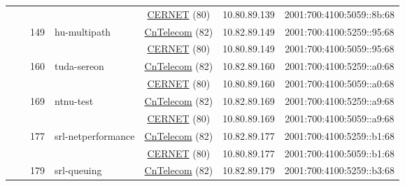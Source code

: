 \begin{small}
\begin{center}
\begin{longtable}{|c|c|c|c|c|c|c|c|}
  &  &  &  & \multicolumn{2}{|c|}{\tiny{\href{http://www.cernet.edu.cn}{CERNET} (80)}} & \tiny{10.80.89.139} & \tiny{2001:700:4100:5059::8b:68} \\* \cline{3-3}\cline{4-4}\cline{5-5}\cline{6-6}\cline{7-7}\cline{8-8}
  &  & \multirow{2}{*}{\tiny{149}} & \multicolumn{1}{|l|}{\multirow{2}{*}{\tiny{hu-multipath}}} & \multicolumn{2}{|c|}{\tiny{\href{http://www.chinatelecom.com.cn}{CnTelecom} (82)}} & \tiny{10.82.89.149} & \tiny{2001:700:4100:5259::95:68} \\* \cline{5-5}\cline{6-6}\cline{7-7}\cline{8-8}
  &  &  &  & \multicolumn{2}{|c|}{\tiny{\href{http://www.cernet.edu.cn}{CERNET} (80)}} & \tiny{10.80.89.149} & \tiny{2001:700:4100:5059::95:68} \\* \cline{3-3}\cline{4-4}\cline{5-5}\cline{6-6}\cline{7-7}\cline{8-8}
  &  & \multirow{2}{*}{\tiny{160}} & \multicolumn{1}{|l|}{\multirow{2}{*}{\tiny{tuda-sereon}}} & \multicolumn{2}{|c|}{\tiny{\href{http://www.chinatelecom.com.cn}{CnTelecom} (82)}} & \tiny{10.82.89.160} & \tiny{2001:700:4100:5259::a0:68} \\* \cline{5-5}\cline{6-6}\cline{7-7}\cline{8-8}
  &  &  &  & \multicolumn{2}{|c|}{\tiny{\href{http://www.cernet.edu.cn}{CERNET} (80)}} & \tiny{10.80.89.160} & \tiny{2001:700:4100:5059::a0:68} \\* \cline{3-3}\cline{4-4}\cline{5-5}\cline{6-6}\cline{7-7}\cline{8-8}
  &  & \multirow{2}{*}{\tiny{169}} & \multicolumn{1}{|l|}{\multirow{2}{*}{\tiny{ntnu-test}}} & \multicolumn{2}{|c|}{\tiny{\href{http://www.chinatelecom.com.cn}{CnTelecom} (82)}} & \tiny{10.82.89.169} & \tiny{2001:700:4100:5259::a9:68} \\* \cline{5-5}\cline{6-6}\cline{7-7}\cline{8-8}
  &  &  &  & \multicolumn{2}{|c|}{\tiny{\href{http://www.cernet.edu.cn}{CERNET} (80)}} & \tiny{10.80.89.169} & \tiny{2001:700:4100:5059::a9:68} \\* \cline{3-3}\cline{4-4}\cline{5-5}\cline{6-6}\cline{7-7}\cline{8-8}
  &  & \multirow{2}{*}{\tiny{177}} & \multicolumn{1}{|l|}{\multirow{2}{*}{\tiny{srl-netperformance}}} & \multicolumn{2}{|c|}{\tiny{\href{http://www.chinatelecom.com.cn}{CnTelecom} (82)}} & \tiny{10.82.89.177} & \tiny{2001:700:4100:5259::b1:68} \\* \cline{5-5}\cline{6-6}\cline{7-7}\cline{8-8}
  &  &  &  & \multicolumn{2}{|c|}{\tiny{\href{http://www.cernet.edu.cn}{CERNET} (80)}} & \tiny{10.80.89.177} & \tiny{2001:700:4100:5059::b1:68} \\* \cline{3-3}\cline{4-4}\cline{5-5}\cline{6-6}\cline{7-7}\cline{8-8}
  &  & \multirow{2}{*}{\tiny{179}} & \multicolumn{1}{|l|}{\multirow{2}{*}{\tiny{srl-queuing}}} & \multicolumn{2}{|c|}{\tiny{\href{http://www.chinatelecom.com.cn}{CnTelecom} (82)}} & \tiny{10.82.89.179} & \tiny{2001:700:4100:5259::b3:68} \\* \cline{5-5}\cline{6-6}\cline{7-7}\cline{8-8}

\end{longtable}
\end{center}
\end{small}
